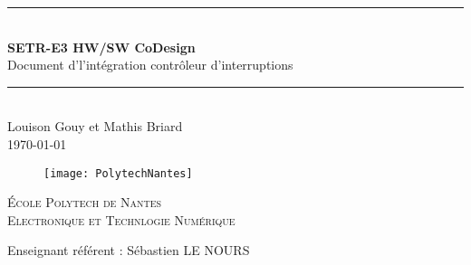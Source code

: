 \newcommand{\HRule}{\rule{\linewidth}{0.5mm}} %

\vspace*{1cm}

\begin{center} %
	\HRule \\[0.2cm] %
	\Large
	\textbf{SETR-E3 HW/SW CoDesign}\\ %
	\vspace{1cm}
Document d'l’intégration contrôleur d'interruptions \\

	\large
	\HRule \\[1.5cm] %
	\normalsize
	Louison Gouy et Mathis Briard\\
	\today %
\end{center}

\begin{figure}[H] %
	\centering
	\texttt{[image: PolytechNantes]}
\end{figure}

\vspace{2cm}

\begin{center}\large %
	\textsc{École Polytech de Nantes}\\
	\textsc{Electronique et Technlogie Numérique}
\end{center}

\vspace{2cm}

\noindent
Enseignant référent : Sébastien LE NOURS 
\vspace{2cm}